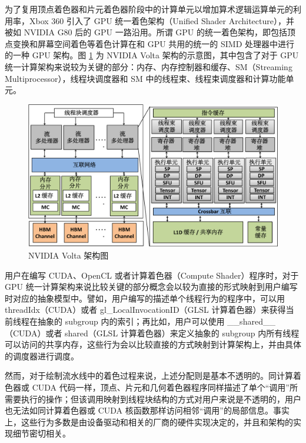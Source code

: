 为了复用顶点着色器和片元着色器阶段中的计算单元以增加算术逻辑运算单元的利用率，Xbox 360 \cite{1624324}引入了 GPU 统一着色架构（Unified Shader Architecture），并被如 NVIDIA G80 \cite{4523358}后的 GPU 一路沿用。所谓 GPU 的统一着色架构，即包括顶点变换和屏幕空间着色等着色计算在和 GPU 共用的统一的 SIMD 处理器中进行的一种 GPU 架构。图 \ref{fig:volta_arch} 为 NVIDIA Volta 架构的示意图，其中包含了对于 GPU 统一计算架构来说较为关键的部分：内存、内存控制器和缓存、SM（Streaming Multiprocessor），线程块调度器和 SM 中的线程束、线程束调度器和计算功能单元。

\begin{figure}
    \centering
    \includegraphics[width=1.0\linewidth]{figures/Volta_archi-crop-zh.pdf}
    \caption{NVIDIA Volta 架构图\cite{9138922}}
    \label{fig:volta_arch}
\end{figure}

用户在编写 CUDA、OpenCL 或者计算着色器（Compute Shader）程序时，对于 GPU 统一计算架构来说比较关键的部分概念会以较为直接的形式映射到用户编写时对应的抽象模型中。譬如，用户编写的描述单个线程行为的程序中，可以用 threadIdx（CUDA）或者 gl\_LocalInvocationID（GLSL 计算着色器）来获得当前线程在抽象的 subgroup 内的索引；再比如，用户可以使用 \_\_shared\_\_（CUDA）或者 shared（GLSL 计算着色器）来定义抽象的 subgroup 内所有线程可以访问的共享内存，这些行为会以比较直接的方式映射到计算架构上，并由具体的调度器进行调度。

然而，对于绘制流水线中的着色过程来说，上述分配则是基本不透明的。同计算着色器或 CUDA 代码一样，顶点、片元和几何着色器程序同样描述了单个“调用”所需要执行的操作；但该调用映射到线程块结构的方式对用户来说是不透明的，用户也无法如同计算着色器或 CUDA 核函数那样访问相邻“调用”的局部信息。事实上，这些行为多数是由设备驱动和相关的厂商的硬件实现决定的，并且和架构的实现细节密切相关。

